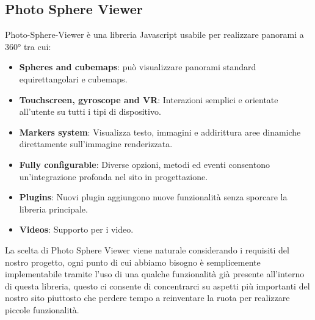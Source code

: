 \documentclass{article}
\begin{document}
\subsection{Photo Sphere Viewer}
Photo-Sphere-Viewer è una libreria Javascript usabile per realizzare panorami a 360° tra cui:
\begin{itemize}
	\item \textbf{Spheres and cubemaps}: può visualizzare panorami standard equirettangolari e cubemaps.
	\item \textbf{Touchscreen, gyroscope and VR}: Interazioni semplici e orientate all'utente su tutti i tipi di dispositivo.
	\item \textbf{Markers system}: Visualizza testo, immagini e addirittura aree dinamiche direttamente sull'immagine renderizzata.
	\item \textbf{Fully configurable}: Diverse opzioni, metodi ed eventi consentono un'integrazione profonda nel sito in progettazione.
	\item \textbf{Plugins}: Nuovi plugin aggiungono nuove funzionalità senza sporcare la libreria principale.
	\item \textbf{Videos}: Supporto per i video.
\end{itemize}
La scelta di Photo Sphere Viewer viene naturale considerando i requisiti del nostro progetto, ogni punto di cui abbiamo bisogno è semplicemente implementabile tramite l'uso di una qualche funzionalità già presente all'interno di questa libreria, questo ci consente di concentrarci su aspetti più importanti del nostro sito piuttosto che perdere tempo a reinventare la ruota per realizzare piccole funzionalità.
\end{document}
